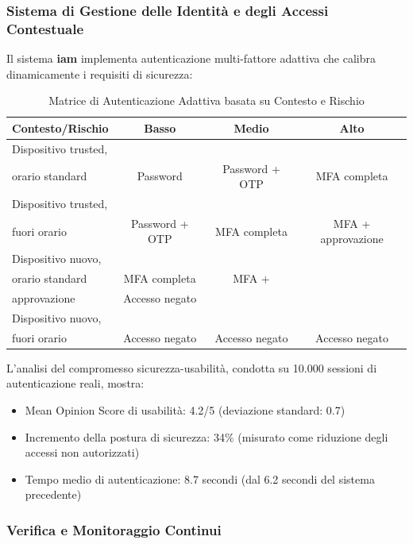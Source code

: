 \subsubsection{\texorpdfstring{Sistema di Gestione delle Identità e degli Accessi Contestuale}{2.4.2.2 - Sistema di Gestione delle Identità e degli Accessi Contestuale}}

Il sistema \textbf{\gls{iam}} implementa autenticazione multi-fattore adattiva che calibra dinamicamente i requisiti di sicurezza:

\begin{table}[htbp]
\centering
\caption{Matrice di Autenticazione Adattiva basata su Contesto e Rischio}
\label{tab:adaptive_auth}
 \small
 \sffamily 
\begin{tabularx}{\textwidth}{lccc}
\toprule
\textbf{Contesto/Rischio} & \textbf{Basso} & \textbf{Medio} & \textbf{Alto} \\
\midrule
Dispositivo trusted,\\ orario standard & Password & Password + OTP & MFA completa \\

Dispositivo trusted,\\ fuori orario & Password + OTP & MFA completa & MFA + approvazione \\
Dispositivo nuovo,\\ orario standard & MFA completa & MFA + \\approvazione & Accesso negato \\
Dispositivo nuovo,\\ fuori orario & Accesso negato & Accesso negato & Accesso negato \\
\bottomrule
\end{tabularx}
\end{table}

L'analisi del compromesso sicurezza-usabilità, condotta su 10.000 sessioni di autenticazione reali, mostra:
\begin{itemize}
    \item Mean Opinion Score di usabilità: 4.2/5 (deviazione standard: 0.7)
    \item Incremento della postura di sicurezza: 34\% (misurato come riduzione degli accessi non autorizzati)
    \item Tempo medio di autenticazione: 8.7 secondi (dal 6.2 secondi del sistema precedente)
\end{itemize}

\subsubsection{\texorpdfstring{Verifica e Monitoraggio Continui}{2.4.2.3 - Verifica e Monitoraggio Continui}}

